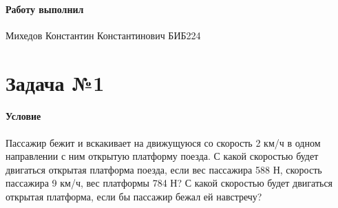 \documentclass[a4paper,12pt]{article}
\begin{document}
    \paragraph{Работу выполнил} Михедов Константин Константинович БИБ224

    \section*{Задача №1}

    \paragraph{Условие} Пассажир бежит и вскакивает на движущуюся со скорость
    2 км/ч в одном направлении с ним открытую платформу поезда. С какой скоростью
    будет двигаться открытая платформа поезда, если вес пассажира 588 Н,
    скорость пассажира 9 км/ч, вес платформы 784 Н? С какой скоростью будет
    двигаться открытая платформа, если бы пассажир бежал ей навстречу?
\end{document}
